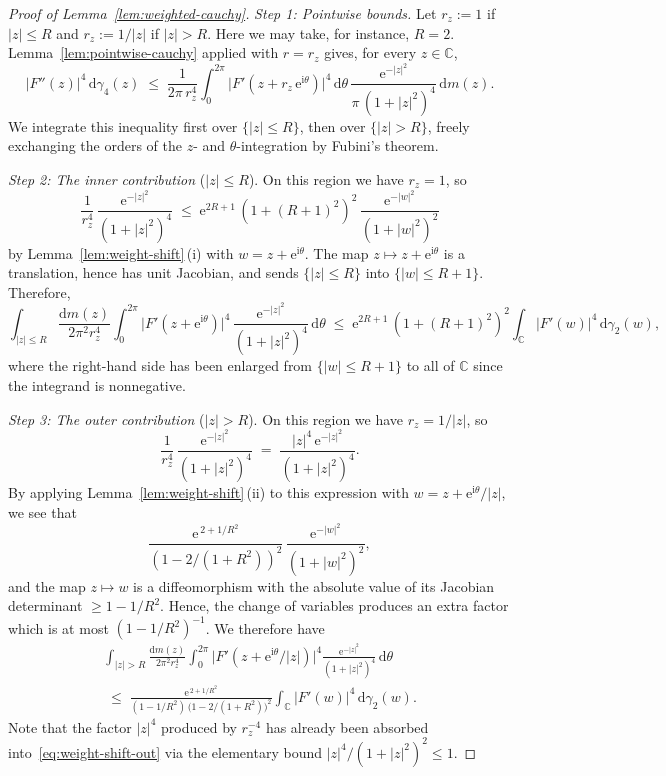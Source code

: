 \documentclass[a4paper,11pt,reqno]{amsart}
\numberwithin{equation}{section}
\theoremstyle{plain} %
\theoremstyle{definition} %
\theoremstyle{remark}
\newcommand{\C}{\mathbb{C}}
\newcommand{\abs}[1]{\lvert #1 \rvert}
\newcommand{\dd}{\mathrm{d}}
\newcommand{\ee}{\mathrm{e}}
\newcommand{\ii}{\mathrm{i}}
\begin{document}
\begin{proof}[Proof of Lemma~\ref{lem:weighted-cauchy}]

\medskip
\noindent\emph{Step 1: Pointwise bounds.}\;
Let $r_{z} := 1$ if $\abs{z}\le R$ and $r_{z} := 1/\abs{z}$
if $\abs{z}>R$. Here we may take, for instance, $R=2$. Lemma~\ref{lem:pointwise-cauchy} applied
with $r = r_{z}$ gives, for every $z \in \C$,
\[
\abs{F''(z)}^{4}\,\dd\gamma_{4}(z)
\;\le\;
\frac{1}{2\pi\, r_{z}^{4}}\int_{0}^{2\pi}
\abs{F'(z + r_{z}\,\ee^{\ii\theta})}^{4}\, \dd\theta\,
\frac{\ee^{-\abs{z}^{2}}}{\pi\,(1+\abs{z}^{2})^{4}}\,\dd m(z).
\]
We integrate this inequality first over $\{\abs{z}\le R\}$, then over
$\{\abs{z}>R\}$, freely exchanging the orders of the $z$- and
$\theta$-integration by Fubini's theorem.

\medskip
\noindent\emph{Step 2: The inner contribution} ($\abs{z}\le R$).
On this region we have $r_{z} = 1$, so
\[
\frac{1}{r_{z}^{4}}\,\frac{\ee^{-\abs{z}^{2}}}{(1+\abs{z}^{2})^{4}}
\;\le\;
\ee^{2R+1}\,(1+(R+1)^{2})^{2}\,\frac{\ee^{-\abs{w}^{2}}}{(1+\abs{w}^{2})^{2}}
\]
by Lemma~\ref{lem:weight-shift}\,(i) with $w = z + \ee^{\ii\theta}$.
The map $z \mapsto z + \ee^{\ii\theta}$ is a translation, hence has unit
Jacobian, and sends $\{\abs{z}\le R\}$ into $\{\abs{w}\le R+1\}$.
Therefore,
\[
\int_{\abs{z}\le R}\!\frac{\dd m(z)}{2\pi^{2} r_{z}^{4}}\!
\int_{0}^{2\pi}\!\!\abs{F'(z + \ee^{\ii\theta})}^{4}\,
\frac{\ee^{-\abs{z}^{2}}}{(1+\abs{z}^{2})^{4}}\,\dd\theta
\;\le\;
\ee^{2R+1}\,(1+(R+1)^{2})^{2}
\int_{\C}\!\abs{F'(w)}^{4}\,\dd\gamma_{2}(w),
\]
where the right-hand side has been enlarged from $\{\abs{w}\le R+1\}$
to all of $\C$ since the integrand is nonnegative.

\medskip
\noindent\emph{Step 3: The outer contribution} ($\abs{z}>R$).
On this region we have $r_{z} = 1/\abs{z}$, so
\[
\frac{1}{r_{z}^{4}}\,\frac{\ee^{-\abs{z}^{2}}}{(1+\abs{z}^{2})^{4}}
\;=\;
\frac{\abs{z}^{4}\,\ee^{-\abs{z}^{2}}}{(1+\abs{z}^{2})^{4}}.
\]
By applying Lemma~\ref{lem:weight-shift}\,(ii) to this expression with
$w = z + \ee^{\ii\theta}/\abs{z}$, we see that
\[
\frac{\ee^{\,2 + 1/R^{2}}}{(1-2/(1+R^{2}))^{2}}\,
\frac{\ee^{-\abs{w}^{2}}}{(1+\abs{w}^{2})^{2}},
\]
and the map $z\mapsto w$ is a diffeomorphism with the absolute value of its Jacobian
determinant $\ge 1 - 1/R^{2}$. Hence, the change of variables produces an
extra factor which is at most $(1-1/R^{2})^{-1}$. We therefore have
\begin{multline*}
\int_{\abs{z}>R}\frac{\dd m(z)}{2\pi^{2}r_{z}^{4}}
\int_{0}^{2\pi}\!\!\abs{F'(z+\ee^{\ii\theta}/\abs{z})}^{4}
\frac{\ee^{-\abs{z}^{2}}}{(1+\abs{z}^{2})^{4}}\,\dd\theta \\
\;\le\;
\frac{\ee^{\,2+1/R^{2}}}
{(1-1/R^{2})\,\bigl(1-2/(1+R^{2})\bigr)^{2}}
\int_{\C}\abs{F'(w)}^{4}\,\dd\gamma_{2}(w).
\end{multline*}
Note that the factor $\abs{z}^{4}$ produced by $r_{z}^{-4}$ has already
been absorbed into~\eqref{eq:weight-shift-out} via the elementary
bound $\abs{z}^{4}/(1+\abs{z}^{2})^{2}\le 1$.
\medskip


\end{proof}
\end{document}
